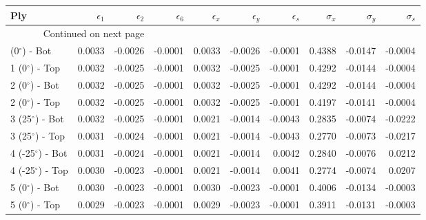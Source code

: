 \begin{table}[H]
\caption{Blah}
\label{blah}
\begin{longtable}{lrrrrrrrrr}
\toprule
                   Ply &  $\epsilon_1$ &  $\epsilon_2$ &  $\epsilon_6$ &  $\epsilon_x$ &  $\epsilon_y$ &  $\epsilon_s$ &  $\sigma_x$ &  $\sigma_y$ &  $\sigma_s$ \\
\midrule
\endhead
\midrule
\multicolumn{3}{r}{{Continued on next page}} \\
\midrule
\endfoot

\bottomrule
\endlastfoot
   1 (0$^\circ$) - Bot &        0.0033 &       -0.0026 &       -0.0001 &        0.0033 &       -0.0026 &       -0.0001 &      0.4388 &     -0.0147 &     -0.0004 \\
   1 (0$^\circ$) - Top &        0.0032 &       -0.0025 &       -0.0001 &        0.0032 &       -0.0025 &       -0.0001 &      0.4292 &     -0.0144 &     -0.0004 \\
   2 (0$^\circ$) - Bot &        0.0032 &       -0.0025 &       -0.0001 &        0.0032 &       -0.0025 &       -0.0001 &      0.4292 &     -0.0144 &     -0.0004 \\
   2 (0$^\circ$) - Top &        0.0032 &       -0.0025 &       -0.0001 &        0.0032 &       -0.0025 &       -0.0001 &      0.4197 &     -0.0141 &     -0.0004 \\
  3 (25$^\circ$) - Bot &        0.0032 &       -0.0025 &       -0.0001 &        0.0021 &       -0.0014 &       -0.0043 &      0.2835 &     -0.0074 &     -0.0222 \\
  3 (25$^\circ$) - Top &        0.0031 &       -0.0024 &       -0.0001 &        0.0021 &       -0.0014 &       -0.0043 &      0.2770 &     -0.0073 &     -0.0217 \\
 4 (-25$^\circ$) - Bot &        0.0031 &       -0.0024 &       -0.0001 &        0.0021 &       -0.0014 &        0.0042 &      0.2840 &     -0.0076 &      0.0212 \\
 4 (-25$^\circ$) - Top &        0.0030 &       -0.0023 &       -0.0001 &        0.0021 &       -0.0014 &        0.0041 &      0.2774 &     -0.0074 &      0.0207 \\
   5 (0$^\circ$) - Bot &        0.0030 &       -0.0023 &       -0.0001 &        0.0030 &       -0.0023 &       -0.0001 &      0.4006 &     -0.0134 &     -0.0003 \\
   5 (0$^\circ$) - Top &        0.0029 &       -0.0023 &       -0.0001 &        0.0029 &       -0.0023 &       -0.0001 &      0.3911 &     -0.0131 &     -0.0003 \\

\end{longtable}
\end{table}
